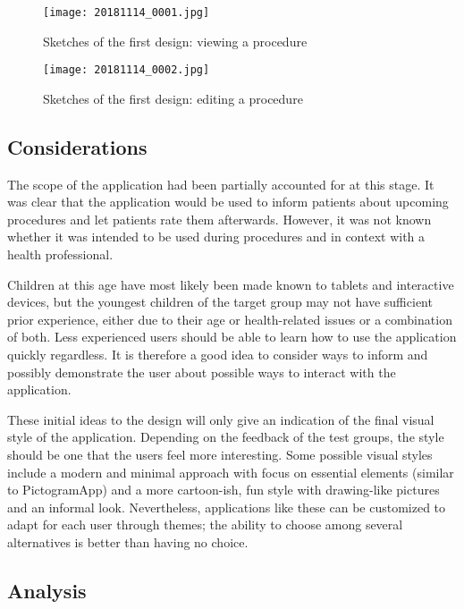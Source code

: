 \begin{sidewaysfigure}
    \centering
    \texttt{[image: 20181114\_0001.jpg]}
    \caption{Sketches of the first design: viewing a procedure}
    \label{fig:sketch-viewprocedure}
\end{sidewaysfigure}

\begin{sidewaysfigure}
    \centering
    \texttt{[image: 20181114\_0002.jpg]}
    \caption{Sketches of the first design: editing a procedure}
    \label{fig:sketch-editprocedure}
\end{sidewaysfigure}

\subsection{Considerations}

The scope of the application had been partially accounted for at this stage. It was clear that the application would be used to inform patients about upcoming procedures and let patients rate them afterwards. However, it was not known whether it was intended to be used during procedures and in context with a health professional.

Children at this age have most likely been made known to tablets and interactive devices, but the youngest children of the target group may not have sufficient prior experience, either due to their age or health-related issues or a combination of both. Less experienced users should be able to learn how to use the application quickly regardless. It is therefore a good idea to consider ways to inform and possibly demonstrate the user about possible ways to interact with the application.

These initial ideas to the design will only give an indication of the final visual style of the application. Depending on the feedback of the test groups, the style should be one that the users feel more interesting. Some possible visual styles include a modern and minimal approach with focus on essential elements (similar to PictogramApp) and a more cartoon-ish, fun style with drawing-like pictures and an informal look. Nevertheless, applications like these can be customized to adapt for each user through themes; the ability to choose among several alternatives is better than having no choice.

\subsection{Analysis}

